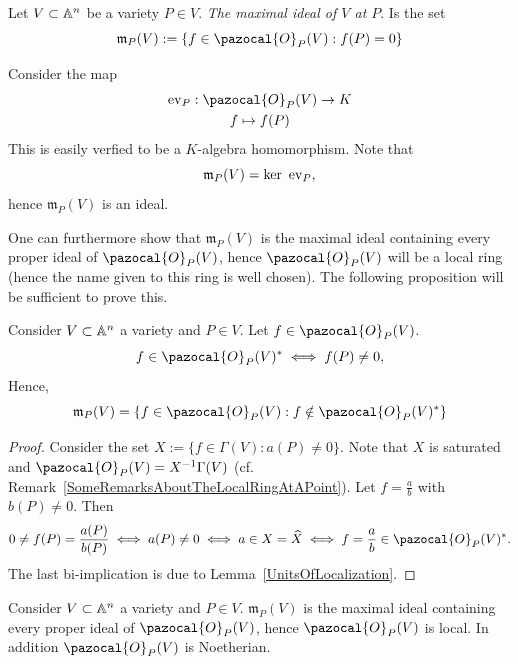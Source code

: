 \begin{definition}
    Let $V\subset \mathbb{A}^n$ be a variety $P\in V$. \textit{The maximal ideal of $V$ at $P$}. Is the set 
    $$\mathfrak{m}_P(V):=\{f\in \pazocal{O}_P(V) : f(P)=0\}$$
\end{definition}
\begin{remark}
    Consider the map 
    \begin{gather*}
        \ev_P: \pazocal{O}_P(V)\rightarrow K\\
        f\mapsto f(P)
    \end{gather*}
    This is easily verfied to be a $K$-algebra homomorphism. Note that 
    $$\mathfrak{m}_P(V) = \ker\ \mathrm{ev}_P,$$
    hence $\mathfrak{m}_P(V)$ is an ideal. 
\end{remark}
One can furthermore show that $\mathfrak{m}_P(V)$ is the maximal ideal containing every proper ideal of $\pazocal{O}_P(V)$, hence $\pazocal{O}_P(V)$ will be a local ring (hence the name given to this ring is well chosen). The following proposition will be sufficient to prove this.
\begin{proposition}
    Consider $V\subset \mathbb{A}^n$ a variety and $P\in V$. Let $f\in \pazocal{O}_P(V)$.
    $$f\in \pazocal{O}_P(V)^\ast \iff f(P)\neq 0,$$
    Hence, 
    $$\mathfrak{m}_P(V)=\left\{f\in \pazocal{O}_P(V) : f\notin \pazocal{O}_P(V)^\ast\right\}$$  
\end{proposition}
\begin{proof}
    Consider the set $X:=\{f\in \Gamma(V) : a(P)\neq 0\}$. Note that $X$ is saturated and $\pazocal{O}_P(V)=X^{-1}\Gamma(V)$ (cf. Remark~\ref{SomeRemarksAboutTheLocalRingAtAPoint}). Let $f=\frac{a}{b}$ with $b(P)\neq0$. Then 
    $$0\neq f(P) = \frac{a(P)}{b(P)}\iff a(P)\neq 0\iff a \in X=\widehat{X} \iff f=\frac{a}{b}\in \pazocal{O}_P(V)^\ast.$$
    The last bi-implication is due to Lemma~\ref{UnitsOfLocalization}.
\end{proof}
\begin{corollary}\label{LocalRingOfVarietyAtPointIsLocalAndNoetherian}
    Consider $V\subset \mathbb{A}^n$ a variety and $P\in V$. $\mathfrak{m}_P(V)$ is the maximal ideal containing every proper ideal of $\pazocal{O}_P(V)$, hence $\pazocal{O}_P(V)$ is local. In addition $\pazocal{O}_P(V)$ is Noetherian.  
\end{corollary}
